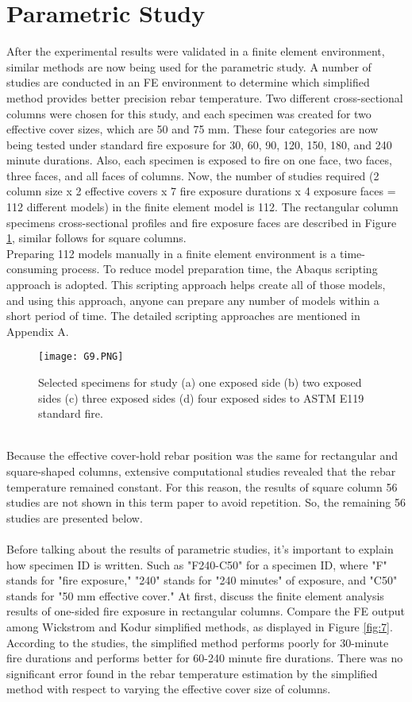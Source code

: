 \documentclass[12pt, letterpaper, oneside]{report}
\begin{document}
\section{Parametric Study}
After the experimental results were validated in a finite element environment, similar methods are now being used for the parametric study. A number of studies are conducted in an FE environment to determine which simplified method provides better precision rebar temperature. Two different cross-sectional columns were chosen for this study, and each specimen was created for two effective cover sizes, which are 50 and 75 mm. These four categories are now being tested under standard fire \cite{R9} exposure for 30, 60, 90, 120, 150, 180, and 240 minute durations. Also, each specimen is exposed to fire on one face, two faces, three faces, and all faces of columns. Now, the number of studies required (2 column size x 2 effective covers x 7 fire exposure durations x 4 exposure faces = 112 different models) in the finite element model is 112. The rectangular column specimens cross-sectional profiles and fire exposure faces are described in Figure \ref{fig:6}, similar follows for square columns.\\
Preparing 112 models manually in a finite element environment is a time-consuming process. To reduce model preparation time, the Abaqus scripting \cite{R14} approach is adopted. This scripting approach helps create all of those models, and using this approach, anyone can prepare any number of models within a short period of time. The detailed scripting approaches are mentioned in Appendix A.
\\
\begin{figure}
    \centering
    \texttt{[image: G9.PNG]}
    \caption{Selected specimens for study (a) one exposed side (b) two exposed sides (c) three exposed sides (d) four exposed sides to ASTM E119 \cite{R9} standard fire.}
    \label{fig:6}
\end{figure}
\\
Because the effective cover-hold rebar position was the same for rectangular and square-shaped columns, extensive computational studies revealed that the rebar temperature remained constant. For this reason, the results of square column 56 studies are not shown in this term paper to avoid repetition. So, the remaining 56 studies are presented below.\\
\\
Before talking about the results of parametric studies, it's important to explain how specimen ID is written. Such as "F240-C50" for a specimen ID, where "F" stands for "fire exposure," "240" stands for "240 minutes" of exposure, and "C50" stands for "50 mm effective cover." At first, discuss the finite element analysis results of one-sided fire exposure in rectangular columns. Compare the FE output among Wickstrom and Kodur simplified methods, as displayed in Figure \ref{fig:7}. According to the studies, the simplified method performs poorly for 30-minute fire durations and performs better for 60-240 minute fire durations. There was no significant error found in the rebar temperature estimation by the simplified method with respect to varying the effective cover size of columns.\\
\end{document}
